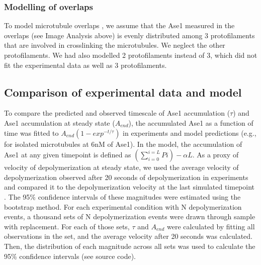 \subsubsection{Modelling of overlaps}
To model microtubule overlaps , we assume that the Ase1 measured in the overlaps (see Image Analysis above) is evenly distributed among 3 protofilaments that are involved in crosslinking the microtubules. We neglect the other protofilaments. We had also modelled 2 protofilaments instead of 3, which did not fit the experimental data as well as 3 protofilaments.

\subsection{Comparison of experimental data and model}
To compare the predicted and observed timescale of Ase1 accumulation ($\tau$) and Ase1 accumulation at steady state ($A_{end}$), the accumulated Ase1 as a function of time was fitted to $A_{end} (1-exp^{-t/\tau})$ in experiments and model predictions (e.g.,  for isolated microtubules at 6nM of Ase1). In the model, the accumulation of Ase1 at any given timepoint is defined as $(\sum_{i=0}^{i=L}Pi)-\alpha L$. As a proxy of velocity of depolymerization at steady state, we used the average velocity of depolymerization observed after 20 seconds of depolymerization in experiments and compared it to the depolymerization velocity at the last simulated timepoint . The 95\% confidence intervals of these magnitudes were estimated using the bootstrap method. For each experimental condition with N depolymerization events, a thousand sets of N depolymerization events were drawn through sample with replacement. For each of those sets, $\tau$ and $A_{end}$ were calculated by fitting all observations in the set, and the average velocity after 20 seconds was calculated. Then, the distribution of each magnitude across all sets was used to calculate the 95\% confidence intervals (see source code).
